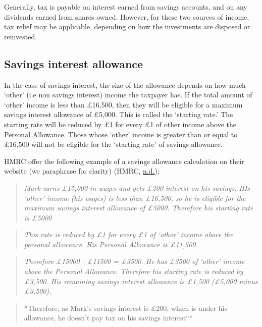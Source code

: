 \documentclass[]{tufte-handout}
\begin{document}
Generally, tax is payable on interest earned from savings accounts, and
on any dividends earned from shares owned. However, for these two
sources of income, tax relief may be applicable, depending on how the
investments are disposed or reinvested.

\hypertarget{savings-interest-allowance}{%
\subsection{Savings interest
allowance}\label{savings-interest-allowance}}

In the case of savings interest, the size of the allowance depends on
how much `other' (i.e non savings interest) income the taxpayer has. If
the total amount of `other' income is less than £16,500, then they will
be eligible for a maximum savings interest allowance of £5,000. This is
called the `starting rate.' The starting rate will be reduced by £1 for
every £1 of other income above the Personal Allowance. Those whose
`other' income is greater than or equal to £16,500 will not be eligible
for the `starting rate' of savings allowance.

HMRC offer the following example of a savings allowance calculation on
their website (we paraphrase for clarity) (HMRC,
\protect\hyperlink{ref-HMRC}{n.d.});

\begin{quote}
\emph{Mark earns £15,000 in wages and gets £200 interest on his savings.
HIs `other' income (his wages) is less than £16,500, so he is eligible
for the maximum savings interest allowance of £5000. Therefore his
starting rate is £5000}
\end{quote}

\begin{quote}
\emph{This rate is reduced by £1 for every £1 of `other' income above
the personal allowance.} \emph{His Personal Allowance is £11,500.}
\end{quote}

\begin{quote}
\emph{Therefore £15000 - £11500 = £3500. He has £3500 of `other' income
above the Personal Allowance. Therefore his starting rate is reduced by
£3,500. His remaining savings interest allowance is £1,500 (£5,000 minus
£3,500).}
\end{quote}

\begin{quote}
*Therefore, as Mark's savings interest is £200, which is under his
allowance, he doesn't pay tax on his savings interest``*
\end{quote}
\end{document}
